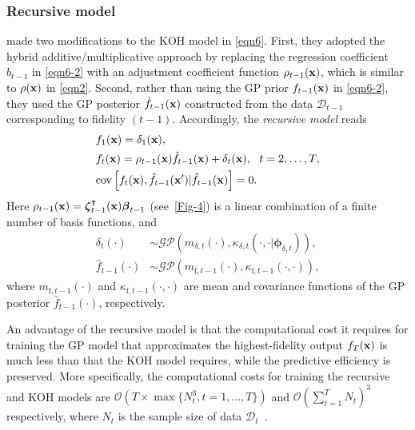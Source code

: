 \documentclass[iicol,sn-basic]{sn-jnl}%
\begin{document}
\subsubsection{Recursive model}\label{Sec423}

\cite{Gratiet2014} made two modifications to the KOH model in \cref{eqn6}.
First, they adopted the hybrid additive/multiplicative approach by replacing the regression coefficient $b_{t-1}$ in \cref{eqn6-2} with an adjustment coefficient function $\rho_{t-1}({\bf x})$, which is similar to $\rho({\bf x})$ in \cref{eqn2}.
Second, rather than using the GP prior $f_{t-1}({\bf x})$ in \cref{eqn6-2}, they used the GP posterior $\hat{f}_{t-1}({\bf x})$ constructed from the data $\mathcal{D}_{t-1}$ corresponding to fidelity $(t-1)$.
Accordingly, the \textit{recursive model} reads
\begin{subequations}\label{eqn14}
	\begin{align}
		& f_1({\bf x}) = \delta_1({\bf x}), \label{eqn14-1}\\
		& f_t({\bf x}) =
		\rho_{t-1}({\bf x}) \hat{f}_{t-1}({\bf x}) + \delta_{t}({\bf x}), \ \ t=2,\dots,T \label{eqn14-2},\\
		&\text{cov}\left[f_{t}({\bf x}),\hat{f}_{t-1}({\bf x}')|\hat{f}_{t-1}({\bf x})\right]=0 
		\label{eqn14-3}.
	\end{align}
\end{subequations}
Here $\rho_{t-1}({\bf x}) = {\boldsymbol \zeta}_{t-1}^\intercal({\bf x}) {\boldsymbol \beta}_{t-1}$ (see~\cref{Fig-4}) is a linear combination of a finite number of basis functions, and
\begin{subequations}\label{eqn15}
	\begin{align}
		\delta_{t}(\cdot) & \sim \mathcal{GP}\left(m_{\delta,t}(\cdot),\kappa_{\delta,t}(\cdot,\cdot|{\boldsymbol \phi}_{\delta,t})\right)
		\label{eqn15-1},\\
		\hat{f}_{t-1}(\cdot) & \sim \mathcal{GP}\left(m_{\text{f},t-1}(\cdot),\kappa_{\text{f},t-1}(\cdot,\cdot)\right) 
		\label{eqn15-2},
	\end{align}
\end{subequations}
where $m_{\text{f},t-1}(\cdot)$ and $\kappa_{\text{f},t-1}(\cdot,\cdot)$ are mean and covariance functions of the GP posterior $\hat{f}_{t-1}(\cdot)$, respectively.

An advantage of the recursive model is that the computational cost it requires for training the GP model that approximates the highest-fidelity output $f_T({\bf x})$ is much less than that the KOH model requires, while the predictive efficiency is preserved.
More specifically, the computational costs for training the recursive and KOH models are $\mathcal{O}\left(T \times \max\{N_t^3,t=1,\dots,T\}\right)$ and $\mathcal{O}(\sum_{t=1}^T N_t)^3$ respectively, where $N_t$ is the sample size of data $\mathcal{D}_t$~\citep{Gratiet2014}. 
\end{document}
